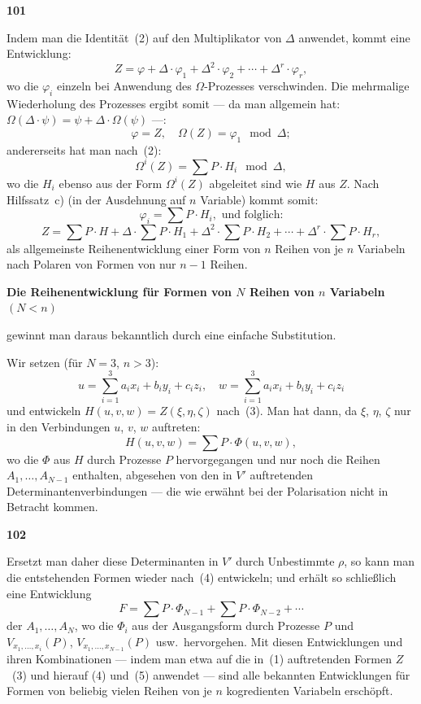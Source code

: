 \documentclass[12pt,a4paper]{article}
\begin{document}
\newpage
\begin{center}
\textbf{101}
\end{center}

Indem man die Identit\"at~(2) auf den Multiplikator von $\Delta$ anwendet, kommt eine Entwicklung:
\[Z = \varphi + \Delta \cdot \varphi_1 + \Delta^2 \cdot \varphi_2 + \cdots + \Delta^r \cdot \varphi_r,\]
wo die $\varphi_i$ einzeln bei Anwendung des $\Omega$-Prozesses verschwinden. Die mehrmalige Wiederholung des Prozesses ergibt somit --- da man allgemein hat: $\Omega(\Delta \cdot \psi) = \psi + \Delta \cdot \Omega(\psi)$ ---:
\[\varphi = Z, \quad \Omega(Z) = \varphi_1 \mod \Delta;\]
andererseits hat man nach~(2):
\[\Omega^{i}(Z) = \sum P \cdot H_i \mod \Delta,\]
wo die $H_i$ ebenso aus der Form $\Omega^{i}(Z)$ abgeleitet sind wie $H$ aus $Z$. Nach Hilfssatz~c) (in der Ausdehnung auf $n$ Variable) kommt somit:
\[\varphi_i = \sum P \cdot H_i, \text{ und folglich:}\]
\begin{equation}\tag{3}
Z = \sum P \cdot H + \Delta \cdot \sum P \cdot H_1 + \Delta^2 \cdot \sum P \cdot H_2 + \cdots + \Delta^r \cdot \sum P \cdot H_r,
\end{equation}
als allgemeinste Reihenentwicklung einer Form von $n$ Reihen von je $n$ Variabeln nach Polaren von Formen von nur $n-1$ Reihen.

\vspace{1em}
\begin{center}
\textbf{Die Reihenentwicklung f\"ur Formen von $N$ Reihen von $n$ Variabeln $(N < n)$}
\end{center}

gewinnt man daraus bekanntlich durch eine einfache Substitution.

Wir setzen (f\"ur $N = 3$, $n > 3$):
\[
u = \sum_{i=1}^{3} a_i x_i + b_i y_i + c_i z_i, \quad
w = \sum_{i=1}^{3} a_i x_i + b_i y_i + c_i z_i
\]
und entwickeln $H(u, v, w) = Z(\xi, \eta, \zeta)$ nach~(3). Man hat dann, da $\xi$, $\eta$, $\zeta$ nur in den Verbindungen $u$, $v$, $w$ auftreten:
\[H(u, v, w) = \sum P \cdot \Phi(u, v, w),\]
wo die $\Phi$ aus $H$ durch Prozesse $P$ hervorgegangen und nur noch die Reihen $A_1, \ldots, A_{N-1}$ enthalten, abgesehen von den in $V'$ auftretenden Determinantenverbindungen --- die wie erw\"ahnt bei der Polarisation nicht in Betracht kommen.

\newpage
\begin{center}
\textbf{102}
\end{center}

Ersetzt man daher diese Determinanten in $V'$ durch Unbestimmte $\rho$, so kann man die entstehenden Formen wieder nach~(4) entwickeln; und erh\"alt so schlie\ss lich eine Entwicklung
\begin{equation}\tag{5}
F = \sum P \cdot \Phi_{N-1} + \sum P \cdot \Phi_{N-2} + \cdots
\end{equation}
der $A_1, \ldots, A_N$, wo die $\Phi_i$ aus der Ausgangsform durch Prozesse $P$ und $V_{x_1,\ldots,x_i}(P)$, $V_{x_1,\ldots,x_{N-1}}(P)$ usw.\ hervorgehen. Mit diesen Entwicklungen und ihren Kombinationen --- indem man etwa auf die in~(1) auftretenden Formen $Z$~(3) und hierauf (4) und~(5) anwendet --- sind alle bekannten Entwicklungen f\"ur Formen von beliebig vielen Reihen von je $n$ kogredienten Variabeln ersch\"opft.
\end{document}
